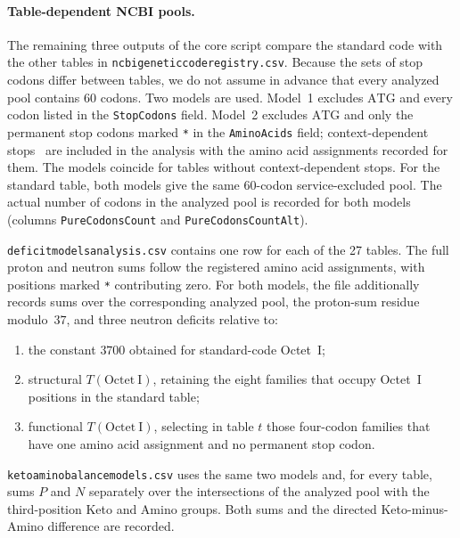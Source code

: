 \documentclass[11pt,a4paper]{article}
\renewcommand{\_}{\origunderscore\allowbreak}
\begin{document}
\paragraph{Table-dependent NCBI pools.}
The remaining three outputs of the core script compare the standard
code with the other tables in
\texttt{ncbi\_genetic\_code\_registry.csv}. Because the sets of stop
codons differ between tables, we do not assume in advance that every
analyzed pool contains 60 codons. Two models are used. Model~1 excludes
$\mathrm{ATG}$ and every codon listed in the \texttt{Stop\_Codons}
field. Model~2 excludes $\mathrm{ATG}$ and only the permanent stop
codons marked \texttt{*} in the \texttt{Amino\_Acids} field;
context-dependent stops~\cite{swart2016,heaphy2016,zahonova2016} are included in the analysis with the amino
acid assignments recorded for them. The models coincide for tables
without context-dependent stops. For the standard table, both models
give the same 60-codon service-excluded pool. The actual number of
codons in the analyzed pool is recorded for both models (columns
\texttt{Pure\_Codons\_Count} and \texttt{Pure\_Codons\_Count\_Alt}).

\texttt{deficit\_models\_analysis.csv} contains one row for each of
the 27 tables. The full proton and neutron sums follow the registered
amino acid assignments, with positions marked
\texttt{*} contributing zero. For both models, the file additionally
records sums over the corresponding analyzed pool, the proton-sum
residue modulo~$37$, and three neutron deficits relative to:
\begin{enumerate}
  \item the constant $3700$ obtained for standard-code Octet~I;
  \item structural $T(\mathrm{Octet~I})$, retaining the eight
        families that occupy Octet~I positions in the standard table;
  \item functional $T(\mathrm{Octet~I})$, selecting in table $t$
        those four-codon families that have one amino acid assignment
        and no permanent stop codon.
\end{enumerate}

\texttt{keto\_amino\_balance\_models.csv} uses the same two models
and, for every table, sums $P$ and $N$ separately over the
intersections of the analyzed pool with the third-position Keto and
Amino groups. Both sums and the directed Keto-minus-Amino difference
are recorded.
\end{document}
